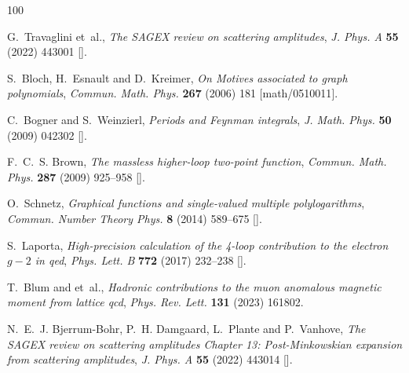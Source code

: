 \documentclass[12pt,a4paper]{article}
\theoremstyle{plain}
\theoremstyle{remark}
\begin{document}
\providecommand{\href}[2]{#2}\begingroup\raggedright\begin{thebibliography}{100}

G.~Travaglini et~al., \emph{{The SAGEX review on scattering amplitudes}},
  \href{https://doi.org/10.1088/1751-8121/ac8380}{\emph{J. Phys. A} {\bfseries
  55} (2022) 443001} [\href{https://arxiv.org/abs/2203.13011}{{}}].

S.~Bloch, H.~Esnault and D.~Kreimer, \emph{{On Motives associated to graph
  polynomials}}, \href{https://doi.org/10.1007/s00220-006-0040-2}{\emph{Commun.
  Math. Phys.} {\bfseries 267} (2006) 181}
  [\href{https://arxiv.org/abs/math/0510011}{{\ttfamily math/0510011}}].

C.~Bogner and S.~Weinzierl, \emph{{Periods and Feynman integrals}},
  \href{https://doi.org/10.1063/1.3106041}{\emph{J. Math. Phys.} {\bfseries 50}
  (2009) 042302} [\href{https://arxiv.org/abs/0711.4863}{{}}].

F.~C.~S. Brown, \emph{The massless higher-loop two-point function},
  {\emph{Commun. Math. Phys.} {\bfseries 287} (2009) 925–958}
  [\href{https://arxiv.org/abs/0804.1660}{{}}].

O.~Schnetz, \emph{Graphical functions and single-valued multiple
  polylogarithms}, {\emph{Commun. Number Theory Phys.} {\bfseries 8} (2014)
  589–675} [\href{https://arxiv.org/abs/1302.6445}{{}}].

S.~Laporta, \emph{High-precision calculation of the 4-loop contribution to the
  electron $g-2$ in qed}, {\emph{Phys. Lett. B} {\bfseries 772} (2017)
  232–238} [\href{https://arxiv.org/abs/1704.06996}{{}}].

T.~Blum and et~al., \emph{Hadronic contributions to the muon anomalous magnetic
  moment from lattice qcd}, {\emph{Phys. Rev. Lett.} {\bfseries 131} (2023)
  161802}.

N.~E.~J. Bjerrum-Bohr, P.~H. Damgaard, L.~Plante and P.~Vanhove, \emph{{The
  SAGEX review on scattering amplitudes Chapter 13: Post-Minkowskian expansion
  from scattering amplitudes}},
  \href{https://doi.org/10.1088/1751-8121/ac7a78}{\emph{J. Phys. A} {\bfseries
  55} (2022) 443014} [\href{https://arxiv.org/abs/2203.13024}{{}}].


\end{thebibliography}
\end{document}
